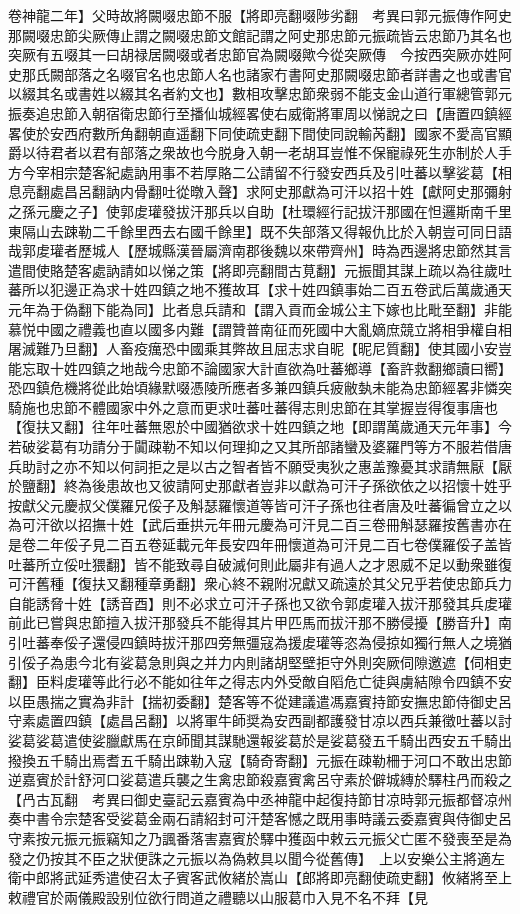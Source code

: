 卷神龍二年】父時故將闕啜忠節不服【將即亮翻啜陟劣翻　考異曰郭元振傳作阿史那闕啜忠節尖厥傳止謂之闕啜忠節文館記謂之阿史那忠節元振疏皆云忠節乃其名也突厥有五啜其一曰胡禄居闕啜或者忠節官為闕啜歟今從突厥傳　今按西突厥亦姓阿史那氏闕部落之名啜官名也忠節人名也諸家冇書阿史那闕啜忠節者詳書之也或書官以綴其名或書姓以綴其名者約文也】數相攻擊忠節衆弱不能支金山道行軍總管郭元振奏追忠節入朝宿衛忠節行至播仙城經畧使右威衛將軍周以悌說之曰【唐置四鎮經畧使於安西府數所角翻朝直遥翻下同使疏吏翻下間使同說輸芮翻】國家不愛高官顯爵以待君者以君有部落之衆故也今脱身入朝一老胡耳豈惟不保寵祿死生亦制於人手方今宰相宗楚客紀處訥用事不若厚賂二公請留不行發安西兵及引吐蕃以擊娑葛【相息亮翻處昌呂翻訥内骨翻吐從暾入聲】求阿史那獻為可汗以招十姓【獻阿史那彌射之孫元慶之子】使郭䖍瓘發拔汗那兵以自助【杜環經行記拔汗那國在怛邏斯南千里東隔山去踈勒二千餘里西去右國千餘里】既不失部落又得報仇比於入朝豈可同日語哉郭䖍瓘者歷城人【歷城縣漢晉屬濟南郡後魏以來帶齊州】時為西邊將忠節然其言遣間使賂楚客處訥請如以悌之策【將即亮翻間古莧翻】元振聞其謀上疏以為往歲吐蕃所以犯邊正為求十姓四鎮之地不獲故耳【求十姓四鎮事始二百五卷武后萬歲通天元年為于偽翻下能為同】比者息兵請和【謂入貢而金城公主下嫁也比毗至翻】非能慕悦中國之禮義也直以國多内難【謂贊普南征而死國中大亂嫡庶競立將相爭權自相屠滅難乃旦翻】人畜疫癘恐中國乘其弊故且屈志求自昵【昵尼質翻】使其國小安豈能忘取十姓四鎮之地哉今忠節不論國家大計直欲為吐蕃鄉導【畜許救翻鄉讀曰嚮】恐四鎮危機將從此始頃緣默啜憑陵所應者多兼四鎮兵疲敝埶未能為忠節經畧非憐突騎施也忠節不體國家中外之意而更求吐蕃吐蕃得志則忠節在其掌握豈得復事唐也【復扶又翻】往年吐蕃無恩於中國猶欲求十姓四鎮之地【即謂萬歲通天元年事】今若破娑葛有功請分于闐疎勒不知以何理抑之又其所部諸蠻及婆羅門等方不服若借唐兵助討之亦不知以何詞拒之是以古之智者皆不願受夷狄之惠盖豫憂其求請無厭【厭於鹽翻】終為後患故也又彼請阿史那獻者豈非以獻為可汗子孫欲依之以招懷十姓乎按獻父元慶叔父僕羅兄俀子及斛瑟羅懷道等皆可汗子孫也往者唐及吐蕃徧曾立之以為可汗欲以招撫十姓【武后垂拱元年冊元慶為可汗見二百三卷冊斛瑟羅按舊書亦在是卷二年俀子見二百五卷延載元年長安四年冊懷道為可汗見二百七卷僕羅俀子盖皆吐蕃所立俀吐猥翻】皆不能致尋自破滅何則此屬非有過人之才恩威不足以動衆雖復可汗舊種【復扶又翻種章勇翻】衆心終不親附况獻又疏遠於其父兄乎若使忠節兵力自能誘脅十姓【誘音酉】則不必求立可汗子孫也又欲令郭䖍瓘入拔汗那發其兵䖍瓘前此已嘗與忠節擅入拔汗那發兵不能得其片甲匹馬而拔汗那不勝侵擾【勝音升】南引吐蕃奉俀子還侵四鎮時拔汗那四旁無彊寇為援䖍瓘等恣為侵掠如獨行無人之境猶引俀子為患今北有娑葛急則與之并力内則諸胡堅壁拒守外則突厥伺隙邀遮【伺相吏翻】臣料䖍瓘等此行必不能如往年之得志内外受敵自䧟危亡徒與虜結隙令四鎮不安以臣愚揣之實為非計【揣初委翻】楚客等不從建議遣馮嘉賓持節安撫忠節侍御史呂守素處置四鎮【處昌呂翻】以將軍牛師奨為安西副都護發甘凉以西兵兼徵吐蕃以討娑葛娑葛遣使娑臘獻馬在京師聞其謀馳還報娑葛於是娑葛發五千騎出西安五千騎出撥換五千騎出焉耆五千騎出踈勒入寇【騎奇寄翻】元振在疎勒柵于河口不敢出忠節逆嘉賓於計舒河口娑葛遣兵襲之生禽忠節殺嘉賓禽呂守素於僻城縳於驛柱冎而殺之【冎古瓦翻　考異曰御史臺記云嘉賓為中丞神龍中起復持節甘凉時郭元振都督凉州奏中書令宗楚客受娑葛金兩石請紹封可汗楚客憾之既用事時議云委嘉賓與侍御史呂守素按元振元振竊知之乃諷番落害嘉賓於驛中獲函中敕云元振父亡匿不發喪至是為發之仍按其不臣之狀便誅之元振以為偽敕具以聞今從舊傳】　上以安樂公主將適左衛中郎將武延秀遣使召太子賓客武攸緒於嵩山【郎將即亮翻使疏吏翻】攸緒將至上敕禮官於兩儀殿設别位欲行問道之禮聽以山服葛巾入見不名不拜【見